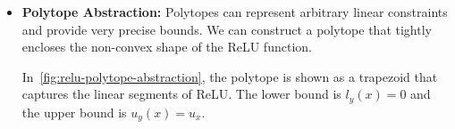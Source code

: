 \documentclass[oneside,11pt,dvipsnames]{book}
\numberwithin{equation}{section}
\theoremstyle{definition}
\theoremstyle{remark}
\newcommand{\tvn}[1]{\iftoggle{usecomment}{{\color{red}{[TVN]: #1}}}{}}
\newcommand{\hd}[1]{\iftoggle{usecomment}{{\color{blue}{[HD]: #1}}}{}}
\begin{document}
\begin{itemize}



    \item \textbf{Polytope Abstraction:} Polytopes can represent arbitrary linear constraints and provide very precise bounds. We can construct a polytope that tightly encloses the non-convex shape of the ReLU function.

    In~\autoref{fig:relu-polytope-abstraction}, the polytope is shown as a \colorbox{yellowfill}{trapezoid} that captures the linear segments of ReLU. The lower bound is $l_y(x) = 0$ and the upper bound is $u_y(x) = u_x$. %

\end{itemize}


\end{document}
